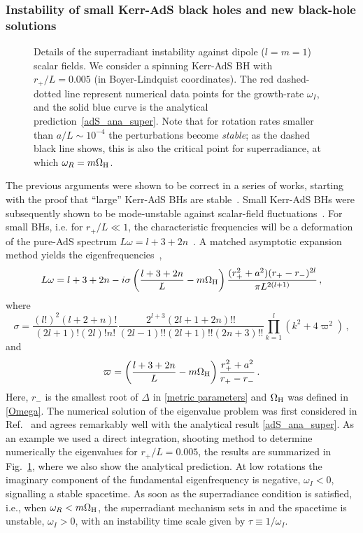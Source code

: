 \documentclass[11pt]{article}
\newcommand{\be}{\begin{equation}}
\newcommand{\ee}{\end{equation}}
\numberwithin{equation}{section} %
\begin{document}
\subsubsection{Instability of small Kerr-AdS black holes and new black-hole solutions}\label{sec:KerrAdS}

%
\begin{figure}[ht]
\begin{center}
\end{center}
\caption{Details of the superradiant instability against dipole ($l=m=1$) scalar fields. We consider a spinning Kerr-AdS BH with $r_+/L=0.005$ (in Boyer-Lindquist coordinates).
The red dashed-dotted line represent numerical data points for the growth-rate $\omega_I$, and the solid blue curve is the analytical prediction~\eqref{adS_ana_super}.
Note that for rotation rates smaller than $a/L\sim 10^{-4}$ the perturbations become {\it stable}; as the dashed black line shows, this is also the critical point for superradiance, at which $\omega_R=m\Omega_{\rm H}$.}
\label{fig:KerrAdS_scalar}
\end{figure}
%
The previous arguments were shown to be correct in a series of works, starting with the proof that ``large''
Kerr-AdS BHs are stable~\cite{Hawking:1999dp}. Small Kerr-AdS BHs were subsequently shown to be mode-unstable against
scalar-field fluctuations~\cite{Cardoso:2004hs,Cardoso:2006wa,Uchikata:2009zz}. For small BHs, i.e. for $r_+/L\ll 1$,
the characteristic frequencies will be a deformation of the pure-AdS spectrum $L\omega=l+3+2n$~\cite{Burgess:1984ti}.
A matched asymptotic expansion method yields the eigenfrequencies~\cite{Cardoso:2004hs,Uchikata:2009zz},
%
\be
L\omega=l+3+2n-i\sigma\left(\frac{l+3+2n}{L}-m\Omega_{\rm H}\right)\frac{(r_+^2+a^2)(r_+-r_-)^{2l}}{\pi L^{2(l+1)}}\,,\label{adS_ana_super}
\ee
%
where
%
\be
\sigma=\frac{(l!)^2(l+2+n)!}{(2l+1)!(2l)!n!}\frac{2^{l+3}(2l+1+2n)!!}{(2l-1)!!(2l+1)!!(2n+3)!!}\prod_{k=1}^{l}(k^2+4\varpi^2)\,,
\ee
%
and
%
\be
\varpi=\left(\frac{l+3+2n}{L}-m\Omega_{\rm H}\right)\frac{r_+^2+a^2}{r_+-r_-}\,.
\ee
%
Here, $r_-$ is the smallest root of $\Delta$ in \eqref{metric parameters} and $\Omega_{\rm H}$ was defined in \eqref{Omega}.
The numerical solution of the eigenvalue problem was first considered in Ref.~\cite{Uchikata:2009zz} and agrees remarkably well with 
the analytical result \eqref{adS_ana_super}. As an example we used a direct integration, shooting method to determine numerically the eigenvalues
for $r_+/L=0.005$, the results are summarized in Fig.~\ref{fig:KerrAdS_scalar}, where we also show the analytical prediction.
At low rotations the imaginary component of the fundamental eigenfrequency is negative, $\omega_I<0$, signalling a stable spacetime.
As soon as the superradiance condition is satisfied, i.e., when $\omega_R<m\Omega_{\rm H}$, the superradiant mechanism sets in and the spacetime
is unstable, $\omega_I>0$, with an instability time scale given by $\tau\equiv 1/\omega_I$.
\end{document}
